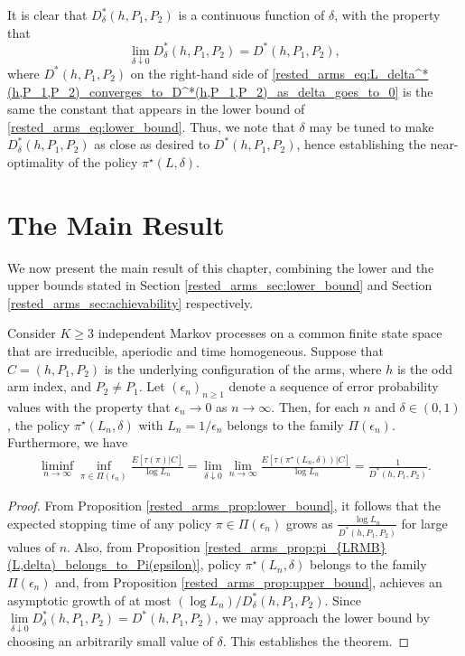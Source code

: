 It is clear that $D^*_\delta(h,P_1,P_2)$ is a continuous function of $\delta$, with the property that
\begin{equation}
	\lim\limits_{\delta\downarrow 0}D_\delta^*(h,P_1,P_2)=D^*(h,P_1,P_2),\label{rested_arms_eq:L_delta^*(h,P_1,P_2)_converges_to_D^*(h,P_1,P_2)_as_delta_goes_to_0}
\end{equation}
where $D^*(h,P_1,P_2)$ on the right-hand side of \eqref{rested_arms_eq:L_delta^*(h,P_1,P_2)_converges_to_D^*(h,P_1,P_2)_as_delta_goes_to_0} is the same the constant that appears in the lower bound of \eqref{rested_arms_eq:lower_bound}. Thus, we note that $\delta$ may be tuned to make $D_\delta^*(h,P_1,P_2)$ as close as desired to $D^*(h,P_1,P_2)$, hence establishing the near-optimality of the policy $\pi^\star(L,\delta)$.

\section{The Main Result}\label{rested_arms_sec:main_result}
We now present the main result of this chapter, combining the lower and the upper bounds stated in Section \ref{rested_arms_sec:lower_bound} and Section \ref{rested_arms_sec:achievability} respectively.
\begin{theorem}
	Consider $K\geq 3$ independent Markov processes on a common finite state space that are irreducible, aperiodic and time homogeneous. Suppose that $C=(h,P_1,P_2)$ is the underlying configuration of the arms, where $h$ is the odd arm index, and $P_2\neq P_1$. Let $(\epsilon_n)_{n\geq 1}$ denote a sequence of error probability values with the property that $\epsilon_n\to 0$ as $n\to\infty$. Then, for each $n$ and $\delta\in(0,1)$, the policy $\pi^\star(L_n,\delta)$ with $L_n=1/\epsilon_n$ belongs to the family $\Pi(\epsilon_n)$. Furthermore, we have
	\begingroup\allowdisplaybreaks\begin{align}
		\liminf\limits_{n\to\infty}\inf\limits_{\pi\in\Pi(\epsilon_n)}\frac{E[\tau(\pi)|C]}{\log L_n}
		=\lim\limits_{\delta\downarrow 0}\lim\limits_{n\to\infty}\frac{E[\tau(\pi^\star(L_n,\delta))|C]}{\log L_n}=\frac{1}{D^*(h,P_1,P_2)}.
	\end{align}\endgroup
\end{theorem}
\begin{proof}
From Proposition \ref{rested_arms_prop:lower_bound}, it follows that the expected stopping time of any policy $\pi\in\Pi(\epsilon_n)$ grows as $\frac{\log L_n}{D^*(h,P_1,P_2)}$ for large values of $n$. Also, from Proposition \ref{rested_arms_prop:pi_{LRMB}(L,delta)_belongs_to_Pi(epsilon)}, policy $\pi^\star(L_n,\delta)$ belongs to the family $\Pi(\epsilon_n)$ and, from Proposition \ref{rested_arms_prop:upper_bound}, achieves an asymptotic growth of at most $(\log L_n)/D_\delta^*(h,P_1,P_2)$. Since $\lim\limits_{\delta\downarrow 0}D_\delta^*(h,P_1,P_2)=D^*(h,P_1,P_2)$, we may approach the lower bound by choosing an arbitrarily small value of $\delta$. This establishes the theorem.
\end{proof}

